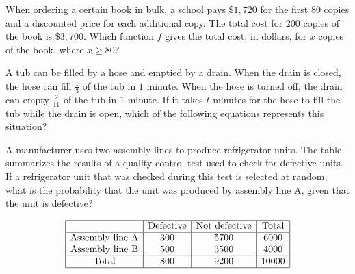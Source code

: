 When ordering a certain book in bulk, a school pays \(\$1{,}720\) for the first \(80\) copies  
and a discounted price for each additional copy.  
The total cost for \(200\) copies of the book is \(\$3{,}700\).  
Which function \(f\) gives the total cost, in dollars, for \(x\) copies of the book, where \(x \geq 80\)?


\vspace{2em}

\noindent\markforreview
\vspace{1em}

A tub can be filled by a hose and emptied by a drain.  
When the drain is closed, the hose can fill \(\frac{1}{3}\) of the tub in \(1\) minute.  
When the hose is turned off, the drain can empty \(\frac{2}{11}\) of the tub in \(1\) minute.  
If it takes \(t\) minutes for the hose to fill the tub while the drain is open,  
which of the following equations represents this situation?


\vspace{2em}

\noindent\markforreview
\vspace{1em}

A manufacturer uses two assembly lines to produce refrigerator units.  
The table summarizes the results of a quality control test used to check for defective units.  
If a refrigerator unit that was checked during this test is selected at random,  
what is the probability that the unit was produced by assembly line A, given that the unit is defective?

\[
\begin{array}{|c|c|c|c|}
\hline
& \text{Defective} & \text{Not defective} & \text{Total} \\
\hline
\text{Assembly line A} & 300 & 5700 & 6000 \\
\text{Assembly line B} & 500 & 3500 & 4000 \\
\hline
\text{Total} & 800 & 9200 & 10000 \\
\hline
\end{array}
\]

